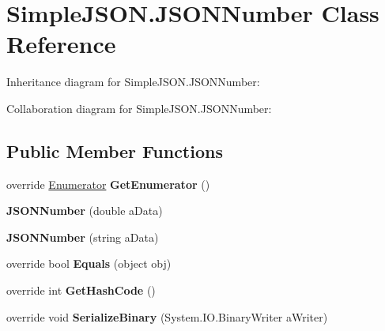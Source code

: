 \hypertarget{classSimpleJSON_1_1JSONNumber}{}\section{Simple\+J\+S\+O\+N.\+J\+S\+O\+N\+Number Class Reference}
\label{classSimpleJSON_1_1JSONNumber}


Inheritance diagram for Simple\+J\+S\+O\+N.\+J\+S\+O\+N\+Number\+:


Collaboration diagram for Simple\+J\+S\+O\+N.\+J\+S\+O\+N\+Number\+:
\subsection*{Public Member Functions}
\begin{DoxyCompactItemize}
\item 
override \hyperlink{structSimpleJSON_1_1JSONNode_1_1Enumerator}{Enumerator} {\bfseries Get\+Enumerator} ()\hypertarget{classSimpleJSON_1_1JSONNumber_a5ec239e6d22e9806cceaa3173138da3d}{}\label{classSimpleJSON_1_1JSONNumber_a5ec239e6d22e9806cceaa3173138da3d}

\item 
{\bfseries J\+S\+O\+N\+Number} (double a\+Data)\hypertarget{classSimpleJSON_1_1JSONNumber_a025fec03c0234346f61ce3bc3e26e2fd}{}\label{classSimpleJSON_1_1JSONNumber_a025fec03c0234346f61ce3bc3e26e2fd}

\item 
{\bfseries J\+S\+O\+N\+Number} (string a\+Data)\hypertarget{classSimpleJSON_1_1JSONNumber_ab50199198312b01b6d72a168bf97b158}{}\label{classSimpleJSON_1_1JSONNumber_ab50199198312b01b6d72a168bf97b158}

\item 
override bool {\bfseries Equals} (object obj)\hypertarget{classSimpleJSON_1_1JSONNumber_a867860c0e38349eec961c05d5da973c4}{}\label{classSimpleJSON_1_1JSONNumber_a867860c0e38349eec961c05d5da973c4}

\item 
override int {\bfseries Get\+Hash\+Code} ()\hypertarget{classSimpleJSON_1_1JSONNumber_a5b0c260d6c09bd10d61c23fdd36b0efa}{}\label{classSimpleJSON_1_1JSONNumber_a5b0c260d6c09bd10d61c23fdd36b0efa}

\item 
override void {\bfseries Serialize\+Binary} (System.\+I\+O.\+Binary\+Writer a\+Writer)\hypertarget{classSimpleJSON_1_1JSONNumber_aa310fb93529b9ab786f5332c06a67054}{}\label{classSimpleJSON_1_1JSONNumber_aa310fb93529b9ab786f5332c06a67054}

\end{DoxyCompactItemize}
